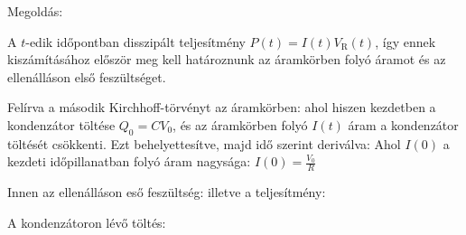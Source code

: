 
\ifdefined\megoldas

 Megoldás: 

 A $t$-edik időpontban disszipált teljesítmény $P(t)=I(t)V_\text{R}(t)$, így ennek kiszámításához először meg kell határoznunk az áramkörben folyó áramot és az ellenálláson első feszültséget.

 Felírva a második Kirchhoff-törvényt az áramkörben:
 ahol 
 hiszen kezdetben a kondenzátor töltése $Q_0=C V_0$, és az áramkörben folyó $I(t)$ áram a kondenzátor töltését csökkenti. Ezt behelyettesítve, majd idő szerint deriválva:
 Ahol $I(0)$ a kezdeti időpillanatban folyó áram nagysága: $I(0)=\frac{V_0}{R}$

 Innen az ellenálláson eső feszültség:
 illetve a teljesítmény:

 A kondenzátoron lévő töltés:

\fi